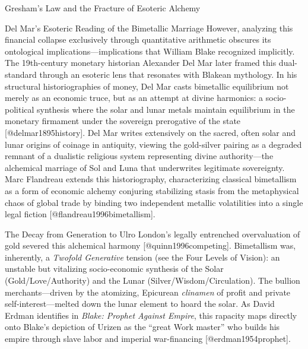 \documentclass[
  ignorenonframetext,
]{beamer}
\begin{document}
\begin{frame}{Gresham's Law and the Fracture of Esoteric Alchemy}
\begin{block}{Del Mar's Esoteric Reading of the Bimetallic Marriage}
\protect{}\label{del-mars-esoteric-reading-of-the-bimetallic-marriage}
However, analyzing this financial collapse exclusively through
quantitative arithmetic obscures its ontological
implications---implications that William Blake recognized implicitly.
The 19th-century monetary historian Alexander Del Mar later framed this
dual-standard through an esoteric lens that resonates with Blakean
mythology. In his structural historiographies of money, Del Mar casts
bimetallic equilibrium not merely as an economic truce, but as an
attempt at divine harmonics: a socio-political synthesis where the solar
and lunar metals maintain equilibrium in the monetary firmament under
the sovereign prerogative of the state {[}@delmar1895history{]}. Del Mar
writes extensively on the sacred, often solar and lunar origins of
coinage in antiquity, viewing the gold-silver pairing as a degraded
remnant of a dualistic religious system representing divine
authority---the alchemical marriage of Sol and Luna that underwrites
legitimate sovereignty. Marc Flandreau extends this historiography,
characterizing classical bimetallism as a form of economic alchemy
conjuring stabilizing stasis from the metaphysical chaos of global trade
by binding two independent metallic volatilities into a single legal
fiction {[}@flandreau1996bimetallism{]}.
\end{block}

\begin{block}{The Decay from Generation to Ulro}
\protect{}\label{the-decay-from-generation-to-ulro}
London's legally entrenched overvaluation of gold severed this
alchemical harmony {[}@quinn1996competing{]}. Bimetallism was,
inherently, a \emph{Twofold Generative} tension (see the Four Levels of
Vision): an unstable but vitalizing socio-economic synthesis of the
Solar (Gold/Love/Authority) and the Lunar (Silver/Wisdom/Circulation).
The bullion merchants---driven by the atomizing, Epicurean
\emph{clinamen} of profit and private self-interest---melted down the
lunar element to hoard the solar. As David Erdman identifies in
\emph{Blake: Prophet Against Empire}, this rapacity maps directly onto
Blake's depiction of Urizen as the ``great Work master'' who builds his
empire through slave labor and imperial war-financing
{[}@erdman1954prophet{]}.


\end{block}
\end{frame}
\end{document}
